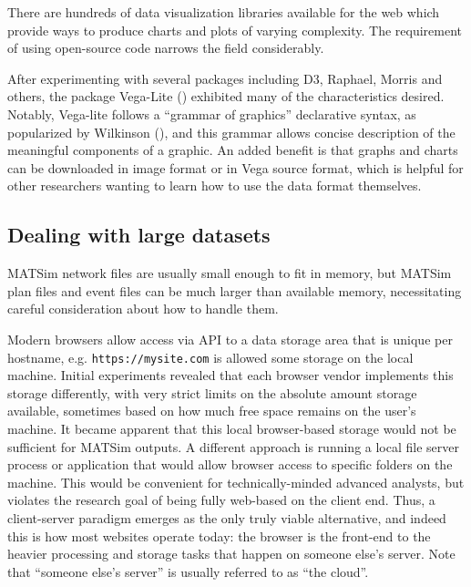 There are hundreds of data visualization libraries available for the web which provide ways to produce charts and plots of varying complexity. The requirement of using open-source code narrows the field considerably.

After experimenting with several packages including D3, Raphael, Morris and others, the package Vega-Lite (\cite{Satyanarayan2016vega}) exhibited many of the characteristics desired. Notably, Vega-lite follows a ``grammar of graphics'' declarative syntax, as popularized by Wilkinson (\cite{Wilkinson2012grammar}), and this grammar allows concise description of the meaningful components of a graphic. An added benefit is that graphs and charts can be downloaded in image format or in Vega source format, which is helpful for other researchers wanting to learn how to use the data format themselves.

\hypertarget{dealing-with-large-datasets}{%
\subsection{Dealing with large datasets}\label{dealing-with-large-datasets}}

MATSim network files are usually small enough to fit in memory, but MATSim plan files and event files can be much larger than available memory, necessitating careful consideration about how to handle them.

Modern browsers allow access via API to a data storage area that is unique per hostname, e.g. \texttt{https://mysite.com} is allowed some storage on the local machine. Initial experiments revealed that each browser vendor implements this storage differently, with very strict limits on the absolute amount storage available, sometimes based on how much free space remains on the user's machine. It became apparent that this local browser-based storage would not be sufficient for MATSim outputs. A different approach is running a local file server process or application that would allow browser access to specific folders on the machine. This would be convenient for technically-minded advanced analysts, but violates the research goal of being fully web-based on the client end. Thus, a client-server paradigm emerges as the only truly viable alternative, and indeed this is how most websites operate today: the browser is the front-end to the heavier processing and storage tasks that happen on someone else's server. Note that ``someone else's server'' is usually referred to as ``the cloud''.

